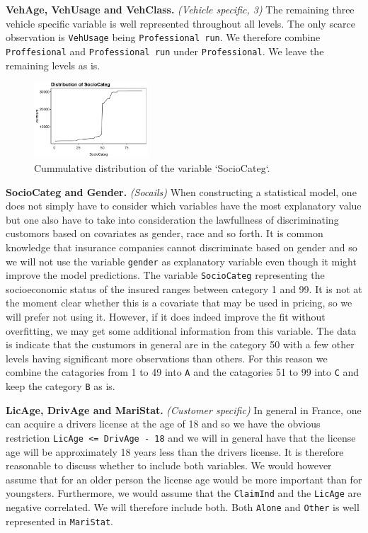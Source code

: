 \documentclass[
]{article}
\begin{document}
\textbf{VehAge, VehUsage and VehClass.} \emph{(Vehicle specific, 3)} The
remaining three vehicle specific variable is well represented throughout
all levels. The only scarce observation is \texttt{VehUsage} being
\texttt{Professional\ run}. We therefore combine \texttt{Proffesional}
and \texttt{Professional\ run} under \texttt{Professional}. We leave the
remaining levels as is.

\begin{figure}
  \begin{center}
    \includegraphics[width=0.38\textwidth]{figures/plot4.png}
  \end{center}
  \caption{Cummulative distribution of the variable `SocioCateg`.}
\end{figure}

\textbf{SocioCateg and Gender.} \emph{(Socails)} When constructing a
statistical model, one does not simply have to consider which variables
have the most explanatory value but one also have to take into
consideration the lawfullness of discriminating customors based on
covariates as gender, race and so forth. It is common knowledge that
insurance companies cannot discriminate based on gender and so we will
not use the variable \texttt{gender} as explanatory variable even though
it might improve the model predictions. The variable \texttt{SocioCateg}
representing the socioeconomic status of the insured ranges between
category 1 and 99. It is not at the moment clear whether this is a
covariate that may be used in pricing, so we will prefer not using it.
However, if it does indeed improve the fit without overfitting, we may
get some additional information from this variable. The data is indicate
that the custumors in general are in the category 50 with a few other
levels having significant more observations than others. For this reason
we combine the catagories from 1 to 49 into \texttt{A} and the
catagories 51 to 99 into \texttt{C} and keep the category \texttt{B} as
is.

\textbf{LicAge, DrivAge and MariStat.} \emph{(Customer specific)} In
general in France, one can acquire a drivers license at the age of 18
and so we have the obvious restriction
\texttt{LicAge\ \textless{}=\ DrivAge\ -\ 18} and we will in general
have that the license age will be approximately 18 years less than the
drivers license. It is therefore reasonable to discuss whether to
include both variables. We would however assume that for an older person
the license age would be more important than for youngsters.
Furthermore, we would assume that the \texttt{ClaimInd} and the
\texttt{LicAge} are negative correlated. We will therefore include both.
Both \texttt{Alone} and \texttt{Other} is well represented in
\texttt{MariStat}.
\end{document}
